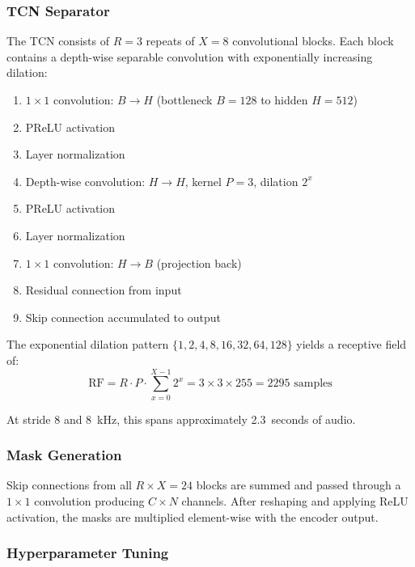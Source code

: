 \documentclass[conference]{IEEEtran}
\begin{document}
\subsubsection{TCN Separator}

The TCN consists of $R = 3$ repeats of $X = 8$ convolutional blocks. Each block contains a depth-wise separable convolution with exponentially increasing dilation:

\begin{enumerate}[leftmargin=*,nosep]
    \item $1 \times 1$ convolution: $B \rightarrow H$ (bottleneck $B{=}128$ to hidden $H{=}512$)
    \item PReLU activation
    \item Layer normalization
    \item Depth-wise convolution: $H \rightarrow H$, kernel $P{=}3$, dilation $2^x$
    \item PReLU activation
    \item Layer normalization
    \item $1 \times 1$ convolution: $H \rightarrow B$ (projection back)
    \item Residual connection from input
    \item Skip connection accumulated to output
\end{enumerate}

The exponential dilation pattern $\{1, 2, 4, 8, 16, 32, 64, 128\}$ yields a receptive field of:
\begin{equation}
\text{RF} = R \cdot P \cdot \sum_{x=0}^{X-1} 2^x = 3 \times 3 \times 255 = 2295 \text{ samples}
\end{equation}

At stride 8 and 8~kHz, this spans approximately 2.3~seconds of audio.

\subsubsection{Mask Generation}

Skip connections from all $R \times X = 24$ blocks are summed and passed through a $1 \times 1$ convolution producing $C \times N$ channels. After reshaping and applying ReLU activation, the masks are multiplied element-wise with the encoder output.

\subsubsection{Hyperparameter Tuning}
\end{document}
